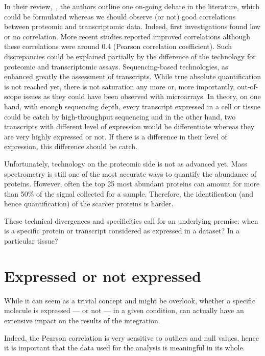 In their review,~\cite{Uhlen:2016}, the authors outline one on-going debate
in the literature, which could be formulated whereas we should observe (or not)
good correlations between proteomic and transcriptomic data.
Indeed, first investigations found low or no correlation. More recent
studies reported improved correlations although these correlations were around
0.4 (Pearson correlation coefficient). Such discrepancies could be explained
partially by the difference of the technology for proteomic and transcriptomic
assays. Sequencing-based technologies, as \Rnaseq\, enhanced greatly the
assessment of transcripts. While true absolute quantification is not reached yet,
there is not saturation any more or, more importantly, out-of-scope issues as
they could have been observed with microarrays. In theory, on one hand, with
enough sequencing depth, every transcript expressed in a cell or tissue could be
catch by high-throughput sequencing and in the other hand, two transcripts with
different level of expression would be differentiate whereas they are very highly
expressed or not. If there is a difference in their level of expression, this
difference should be catch.

Unfortunately, technology on the proteomic side is not as advanced yet.
Mass spectrometry is still one of the most accurate ways to quantify the
abundance of proteins. However, often the top 25 most abundant proteins can
amount for more than 50\% of the signal collected for a sample. Therefore, the
identification (and hence quantification) of the scarcer proteins is harder.


These technical divergences and specificities call for an underlying premise:
when is a specific protein or transcript considered as expressed in a dataset?
In a particular tissue?

\section{Expressed or not expressed}
\label{sec:IntegrationExpressedOrNot}

While it can seem as a trivial concept and might be overlook, whether a specific
molecule is expressed --- or not --- in a given condition, can actually have
an extensive impact on the results of the integration.

Indeed, the Pearson correlation is very sensitive to outliers and null values,
hence it is important that the data used for the analysis is meaningful in
its whole.


